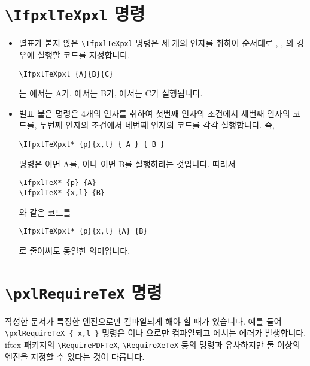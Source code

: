 \documentclass[b5paper,adjustmath,nanum]{oblivoir}
\begin{document}
\section{\texttt{\textbackslash IfpxlTeXpxl} 명령}


\begin{itemize}
\item 별표가 붙지 않은 \verb|\IfpxlTeXpxl| 명령은 세 개의 인자를 취하여 순서대로 \pxlThisTeX[pdfTeX], \pxlThisTeX[XeTeX], \pxlThisTeX[LuaTeX]의 경우에 실행할 코드를 지정합니다. 
\begin{verbatim}
\IfpxlTeXpxl {A}{B}{C}
\end{verbatim}
는 \pxlThisTeX[pdfTeX]에서는 A가, \pxlThisTeX[XeTeX]에서는 B가, \pxlThisTeX[LuaTeX]에서는 C가 실행됩니다.

\item 별표 붙은 명령은 4개의 인자를 취하여 첫번째 인자의 조건에서 세번째 인자의 코드를,
두번째 인자의 조건에서 네번째 인자의 코드를 각각 실행합니다. 즉, 
\begin{verbatim}
\IfpxlTeXpxl* {p}{x,l} { A } { B }
\end{verbatim}
명령은 \pxlThisTeX[pdfTeX]이면 A를,
\pxlThisTeX[XeTeX]이나 \pxlThisTeX[LuaTeX]이면 B를 실행하라는 것입니다.
따라서 
\begin{verbatim}
\IfpxlTeX* {p} {A}
\IfpxlTeX* {x,l} {B}
\end{verbatim}
와 같은 코드를
\begin{verbatim}
\IfpxlTeXpxl* {p}{x,l} {A} {B}
\end{verbatim}
로 줄여써도 동일한 의미입니다.
\end{itemize}

\section{\texttt{\textbackslash pxlRequireTeX} 명령}

\begin{boxedverbatim}
\pxlRequireTeX { [p,x,l] }
\end{boxedverbatim}

작성한 문서가 특정한 엔진으로만 컴파일되게 해야 할 때가 있습니다.
예를 들어 \verb|\pxlRequireTeX { x,l }| 명령은 \pxlThisTeX [XeTeX]이나
\pxlThisTeX [LuaTeX]으로만 컴파일되고 \pxlThisTeX [pdfTeX]에서는 에러가 발생합니다. \textsf{iftex} 패키지의 \verb|\RequirePDFTeX|, \verb|\RequireXeTeX| 등의 명령과 유사하지만
둘 이상의 엔진을 지정할 수 있다는 것이 다릅니다.
\end{document}
